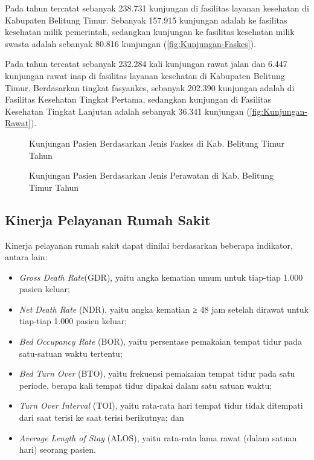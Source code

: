 Pada tahun \tP tercatat sebanyak 238.731 kunjungan di fasilitas layanan kesehatan di Kabupaten Belitung Timur. Sebanyak 157.915 kunjungan adalah ke fasilitas kesehatan milik pemerintah, sedangkan kunjungan ke fasilitas kesehatan milik swasta adalah sebanyak 80.816 kunjungan (\autoref{fig:Kunjungan-Faskes}).

Pada tahun \tP tercatat sebanyak 232.284 kali kunjungan rawat jalan dan 6.447 kunjungan rawat inap di fasilitas layanan kesehatan di Kabupaten Belitung Timur. Berdasarkan tingkat fasyankes, sebanyak 202.390 kunjungan adalah di Fasilitas Kesehatan Tingkat Pertama, sedangkan kunjungan di Fasilitas Kesehatan Tingkat Lanjutan adalah sebanyak 36.341 kunjungan (\autoref{fig:Kunjungan-Rawat}).

\begin{figure}[!htb]
    \centering{}
    \caption{Kunjungan Pasien Berdasarkan Jenis Faskes di Kab. Belitung Timur Tahun \tP}
    \label{fig:Kunjungan-Faskes}
\end{figure}

\begin{figure}[!htb]
    \centering{}
    \caption{Kunjungan Pasien Berdasarkan Jenis Perawatan di Kab. Belitung Timur Tahun \tP}
    \label{fig:Kunjungan-Rawat}
\end{figure}

\subsection{Kinerja Pelayanan Rumah Sakit}
Kinerja pelayanan rumah sakit dapat dinilai berdasarkan beberapa indikator, antara lain:
\begin{itemize}
 \item \emph{Gross Death Rate}(GDR), yaitu angka kematian umum untuk tiap-tiap 1.000 pasien keluar;
 \item \emph{Net Death Rate} (NDR), yaitu angka kematian ≥ 48 jam setelah dirawat untuk tiap-tiap 1.000 pasien keluar;
 \item \emph{Bed Occupancy Rate} (BOR), yaitu persentase pemakaian tempat tidur pada satu-satuan waktu tertentu;
 \item \emph{Bed Turn Over} (BTO), yaitu frekuensi pemakaian tempat tidur pada satu periode, berapa kali tempat tidur dipakai dalam satu satuan waktu;
 \item \emph{Turn Over Interval} (TOI), yaitu rata-rata hari tempat tidur tidak ditempati dari saat terisi ke saat terisi berikutnya; dan
 \item \emph{Average Length of Stay} (ALOS), yaitu rata-rata lama rawat (dalam satuan hari) seorang pasien.
\end{itemize}


